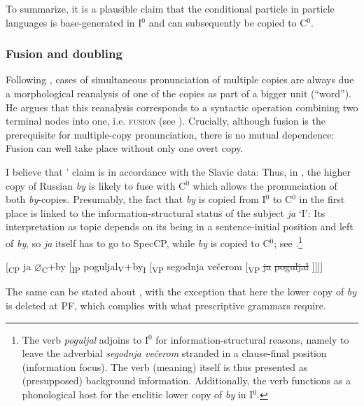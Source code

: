 \documentclass[output=paper]{langscibook}
\begin{document}
\noindent To summarize, it is a plausible claim that the conditional particle in particle languages is base-generated in I$^0$ and can subsequently be copied to C$^0$.


\subsubsection{Fusion and doubling}\label{pitsch:sec:Fusion}

Following \citet{Nunes2004}, cases of simultaneous pronunciation of multiple copies are always due a morphological reanalysis of one of the copies as part of a bigger unit (``word''). He argues that this reanalysis corresponds to a syntactic operation combining two terminal nodes into one, i.e. \textsc{fusion} (see \cites{HalleMarantz1993}[§3.1]{MunozPerez2018}). Crucially, although fusion is the prerequisite for multiple-copy pronunciation, there is no mutual dependence: Fusion can well take place without only one overt copy.

I believe that \citeauthor{Nunes2004}' claim is in accordance with the Slavic data: Thus, in , the higher copy of Russian \textit{by} is likely to fuse with C$^0$ which allows the pronunciation of both \textit{by}-copies. Presumably, the fact that \textit{by} is copied from I$^0$ to C$^0$ in the first place is linked to the information-structural status of the subject \textit{ja} `I': Its interpretation as topic depends on its being in a sentence-initial position and left of \textit{by}, so \textit{ja} itself has to go to SpecCP, while \textit{by} is copied to C$^0$; see .\footnote{The verb \textit{poguljal} adjoins to I$^0$ for information-structural reasons, namely to leave the adverbial \textit{segodnja večerom} stranded in a clause-final position (information focus). The verb (meaning) itself is thus presented as (presupposed) background information. Additionally, the verb functions as a phonological host for the enclitic lower copy of \textit{by} in I$^0$.}

\ea 
{[}\textsubscript{CP} ja $\varnothing$\textsubscript{C}$+$by [\textsubscript{IP} poguljal$\textsubscript{V}+$by\textsubscript{I} [\textsubscript{VP} segodnja večerom [\textsubscript{VP} \sout{ja} \sout{poguljal} ]]]]
\label{pitsch:ex:doubling_Russian_rep_analysis}
\z

\noindent The same can be stated about , with the exception that here the lower copy of \textit{by} is deleted at PF, which complies with what prescriptive grammars require.
\end{document}
